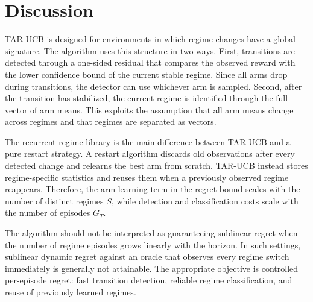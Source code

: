 \documentclass[11pt]{article}
\begin{document}
\section{Discussion}
\label{sec:discussion}

TAR-UCB is designed for environments in which regime changes have a global signature. The algorithm uses this structure in two ways. First, transitions are detected through a one-sided residual that compares the observed reward with the lower confidence bound of the current stable regime. Since all arms drop during transitions, the detector can use whichever arm is sampled. Second, after the transition has stabilized, the current regime is identified through the full vector of arm means. This exploits the assumption that all arm means change across regimes and that regimes are separated as vectors.

The recurrent-regime library is the main difference between TAR-UCB and a pure restart strategy. A restart algorithm discards old observations after every detected change and relearns the best arm from scratch. TAR-UCB instead stores regime-specific statistics and reuses them when a previously observed regime reappears. Therefore, the arm-learning term in the regret bound scales with the number of distinct regimes $S$, while detection and classification costs scale with the number of episodes $G_T$.

The algorithm should not be interpreted as guaranteeing sublinear regret when the number of regime episodes grows linearly with the horizon. In such settings, sublinear dynamic regret against an oracle that observes every regime switch immediately is generally not attainable. The appropriate objective is controlled per-episode regret: fast transition detection, reliable regime classification, and reuse of previously learned regimes.
\end{document}
